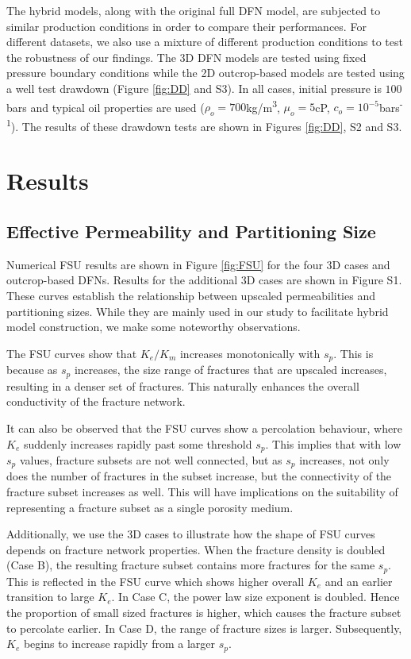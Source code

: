 \documentclass[draft]{agujournal2018}
\begin{document}
The hybrid models, along with the original full DFN model, are subjected to similar production conditions in order to compare their performances. For different datasets, we also use a mixture of different production conditions to test the robustness of our findings. The 3D DFN models are tested using fixed pressure boundary conditions while the 2D outcrop-based models are tested using a well test drawdown (Figure \ref{fig:DD} and S3). In all cases, initial pressure is $100$bars and typical oil properties are used ($\rho_o=700$kg/m\textsuperscript{3}, $\mu_o=5$cP, $c_o=10^{-5}$bars\textsuperscript{-1}). The results of these drawdown tests are shown in Figures \ref{fig:DD}, S2 and S3.

\section{Results}
\subsection{Effective Permeability and Partitioning Size}
Numerical FSU results are shown in Figure \ref{fig:FSU} for the four 3D cases and outcrop-based DFNs. Results for the additional 3D cases are shown in Figure S1. These curves establish the relationship between upscaled permeabilities and partitioning sizes. While they are mainly used in our study to facilitate hybrid model construction, we make some noteworthy observations.

The FSU curves show that $K_e/K_m$ increases monotonically with $s_p$. This is because as $s_p$ increases, the size range of fractures that are upscaled increases, resulting in a denser set of fractures. This naturally enhances the overall conductivity of the fracture network.

It can also be observed that the FSU curves show a percolation behaviour, where $K_e$ suddenly increases rapidly past some threshold $s_p$. This implies that with low $s_p$ values, fracture subsets are not well connected, but as $s_p$ increases, not only does the number of fractures in the subset increase, but the connectivity of the fracture subset increases as well. This will have implications on the suitability of representing a fracture subset as a single porosity medium.

Additionally, we use the 3D cases to illustrate how the shape of FSU curves depends on fracture network properties. When the fracture density is doubled (Case B), the resulting fracture subset contains more fractures for the same $s_p$. This is reflected in the FSU curve which shows higher overall $K_e$ and an earlier transition to large $K_e$. In Case C, the power law size exponent is doubled. Hence the proportion of small sized fractures is higher, which causes the fracture subset to percolate earlier. In Case D, the range of fracture sizes is larger. Subsequently, $K_e$ begins to increase rapidly from a larger $s_p$.
\end{document}
